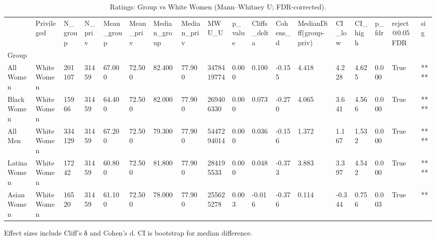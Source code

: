 \begin{table}[htbp]
\centering
\caption{Ratings: Group vs White Women (Mann–Whitney U; FDR-corrected).}
\label{tab:05-bias-ratings}
\begin{tabular}{llllllllllllllllll}
\toprule
 & Privileged & N\_group & N\_priv & Mean\_group & Mean\_priv & Median\_group & Median\_priv & MWU\_U & p\_value & Cliffs\_delta & Cohens\_d & MedianDiff(group-priv) & CI\_low & CI\_high & p\_fdr & reject@0.05FDR & sig \\
Group &  &  &  &  &  &  &  &  &  &  &  &  &  &  &  &  &  \\
\midrule
All Women & White Women & 201107 & 31459 & 67.000 & 72.500 & 82.400 & 77.900 & 3478419774 & 0.000 & 0.100 & -0.155 & 4.418 & 4.228 & 4.625 & 0.000 & True & **** \\
Black Women & White Women & 15966 & 31459 & 64.400 & 72.500 & 82.000 & 77.900 & 269406330 & 0.000 & 0.073 & -0.270 & 4.065 & 3.641 & 4.566 & 0.000 & True & **** \\
All Men & White Women & 334129 & 31459 & 67.200 & 72.500 & 79.300 & 77.900 & 5447294014 & 0.000 & 0.036 & -0.156 & 1.372 & 1.167 & 1.532 & 0.000 & True & **** \\
Latina Women & White Women & 17242 & 31459 & 60.800 & 72.500 & 81.800 & 77.900 & 284195533 & 0.000 & 0.048 & -0.373 & 3.883 & 3.397 & 4.542 & 0.000 & True & **** \\
Asian Women & White Women & 16520 & 31459 & 61.100 & 72.500 & 78.000 & 77.900 & 255625278 & 0.003 & -0.016 & -0.376 & 0.114 & -0.344 & 0.756 & 0.003 & True & ** \\
\bottomrule
\end{tabular}

\begin{tablenotes}[flushleft]
\item \small{Effect sizes include Cliff's δ and Cohen's d. CI is bootstrap for median difference.}
\end{tablenotes}
\end{table}
